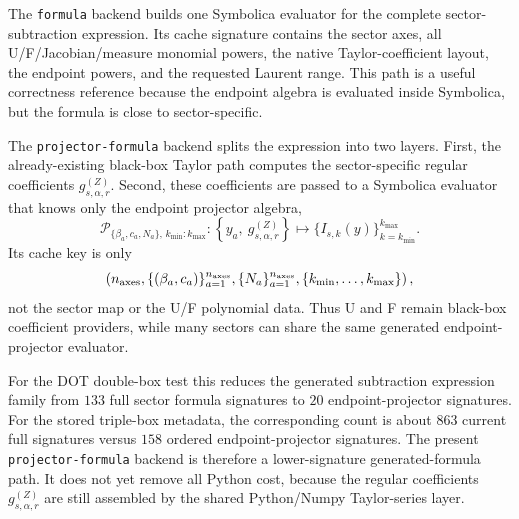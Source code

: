 \documentclass[11pt]{article}
\begin{document}
The \texttt{formula} backend builds one Symbolica evaluator for the complete
sector-subtraction expression.  Its cache signature contains the sector axes,
all U/F/Jacobian/measure monomial powers, the native Taylor-coefficient
layout, the endpoint powers, and the requested Laurent range.  This path is a
useful correctness reference because the endpoint algebra is evaluated inside
Symbolica, but the formula is close to sector-specific.

The \texttt{projector-formula} backend splits the expression into two layers.
First, the already-existing black-box Taylor path computes the sector-specific
regular coefficients \(g_{s,\alpha,r}^{(Z)}\).  Second, these coefficients are
passed to a Symbolica evaluator that knows only the endpoint projector algebra,
\begin{equation}
  \mathcal{P}_{\{\beta_a,c_a,N_a\},\,k_{\min}:k_{\max}}
  :
  \left\{
    y_a,\ g_{s,\alpha,r}^{(Z)}
  \right\}
  \longmapsto
  \{ I_{s,k}(y) \}_{k=k_{\min}}^{k_{\max}} .
\end{equation}
Its cache key is only
\begin{equation}
  \left(
    n_{\rm axes},
    \{(\beta_a,c_a)\}_{a=1}^{n_{\rm axes}},
    \{N_a\}_{a=1}^{n_{\rm axes}},
    \{k_{\min},\ldots,k_{\max}\}
  \right),
\end{equation}
not the sector map or the U/F polynomial data.  Thus U and F remain black-box
coefficient providers, while many sectors can share the same generated
endpoint-projector evaluator.

For the DOT double-box test this reduces the generated subtraction expression
family from \(133\) full sector formula signatures to \(20\) endpoint-projector
signatures.  For the stored triple-box metadata, the corresponding count is
about \(863\) current full signatures versus \(158\) ordered endpoint-projector
signatures.  The present \texttt{projector-formula} backend is therefore a
lower-signature generated-formula path.  It does not yet remove all Python
cost, because the regular coefficients \(g_{s,\alpha,r}^{(Z)}\) are still
assembled by the shared Python/Numpy Taylor-series layer.
\end{document}
